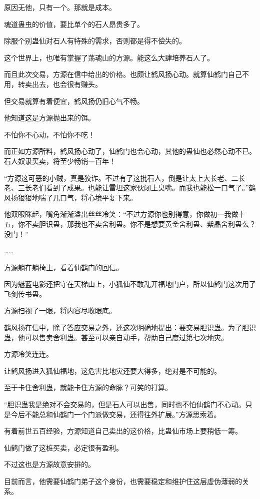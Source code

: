 \begin{this_body}
原因无他，只有一个。那就是成本。

魂道蛊虫的价值，要比单个的石人昂贵多了。

除服个别蛊仙对石人有特殊的需求，否则都是得不偿失的。

这个世界上，也唯有掌握了荡魂山的方源。能这么大肆培养石人了。

而且此次交易，方源在信中给出的价格。也颇让鹤风扬心动。就算仙鹤门自己不用，转卖出去，也会很有赚头。

但交易就算有着便宜，鹤风扬仍旧心气不畅。

他知道这是方源抛出来的饵。

不怕你不心动，不怕你不吃！

而正如方源所料，鹤风扬心动了，仙鹤门也会心动，其他的蛊仙也必然心动不已。石人奴隶买卖，将至少畅销一百年！

“方源这可恶的小贼，真是狡诈。不过有了这批石人，倒是让太上大长老、二长老、三长老们看到了成果。也能让雷坦这家伙闭上臭嘴。而我也能松一口气了。”鹤风扬狠狠地喘了几口气，将心境平复下来。

他双眼眯起，嘴角渐渐溢出丝丝冷笑：“不过方源你也别得意，你做初一我做十五，你不卖胆识蛊，那我也不卖舍利蛊。你不是想要黄金舍利蛊、紫晶舍利蛊么？没门！”

……

方源躺在躺椅上，看着仙鹤门的回信。

因为魅蓝电影还把守在天梯山上，小狐仙不敢乱开福地门户，所以仙鹤门这次用了飞剑传书蛊。

方源扫视了一眼，将内容尽收眼底。

鹤风扬在信中，除了答应交易之外，还这次明确地提出：要交易胆识蛊。为了胆识蛊，他可以售卖舍利蛊。甚至可以亲自动手，帮助自己度过第七次地灾。

方源冷笑连连。

让鹤风扬进入狐仙福地，这危害比地灾还要大得多，绝对是不可能的。

至于卡住舍利蛊，就能卡住方源的命脉？可笑的打算。

“胆识蛊我是绝对不会交易的，但是石人可以出售，同时也不怕仙鹤门不心动。只是今后不能总和仙鹤门一个门派做交易，还得往外扩展。”方源思索着。

有着前世五百经验，方源知道自己卖出的这价格，比蛊仙市场上要稍低一筹。

仙鹤门做了这桩买卖，必定很有盈利。

不过这也是方源故意安排的。

目前而言，他需要仙鹤门弟子这个身份，也需要稳定和维护住这层虚伪薄弱的关系。


\end{this_body}
